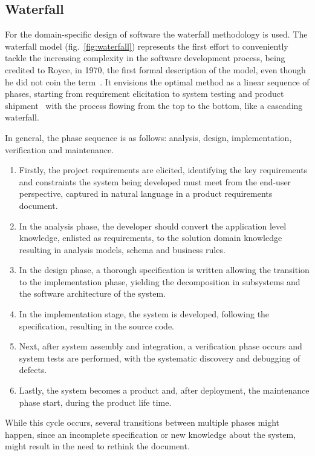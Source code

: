 \subsection{Waterfall}
\label{subsec:waterfall}
For the domain-specific design of software the waterfall methodology is used.
The waterfall model (fig.~\ref{fig:waterfall}) represents the first effort to
conveniently tackle the increasing complexity in the software development
process, being credited to Royce, in 1970, the first formal description of the
model, even though he did not coin the term~\cite{sommerville1996software}. It
envisions the optimal method
as a linear sequence of phases, starting from requirement elicitation to system
testing and product shipment~\cite{cusumano1995beyond} with the process flowing
from the top to the bottom, like a cascading waterfall.

In general, the phase sequence is as follows: analysis, design, implementation,
verification and maintenance.
\begin{enumerate}
  \item Firstly, the project requirements are elicited, identifying the key
    requirements and constraints the system being developed must meet from the
    end-user perspective, captured in natural language in a product requirements document.
  \item In the analysis phase, the developer should convert the application
    level knowledge, enlisted as requirements, to the solution domain knowledge
    resulting in analysis models, schema and business rules.
  \item In the design phase, a thorough specification is written allowing the
    transition to the implementation phase, yielding the decomposition in
    subsystems and the software architecture of the system. 
  \item In the implementation stage, the system is developed, following the
    specification, resulting in the source code.
  \item Next, after system assembly and integration, a verification phase occurs
    and system tests are performed, with the systematic discovery and debugging
    of defects.
  \item Lastly, the system becomes a product and, after deployment, the
    maintenance phase start, during the product life time.
\end{enumerate}
While this cycle occurs, several transitions between multiple phases might
happen, since an incomplete specification or new knowledge about the system,
might result in the need to rethink the document.


